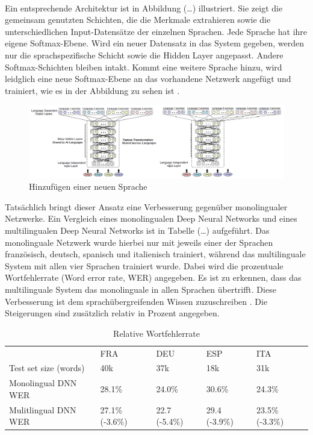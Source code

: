 \\ 
Ein entsprechende Architektur ist in Abbildung (…) illustriert. Sie zeigt die gemeinsam genutzten Schichten, die die Merkmale extrahieren sowie die unterschiedlichen Input-Datensätze der einzelnen Sprachen. Jede Sprache hat ihre eigene Softmax-Ebene. Wird ein neuer Datensatz in das System gegeben, werden nur die sprachspezifische Schicht sowie die Hidden Layer angepasst. Andere Softmax-Schichten bleiben intakt. Kommt eine weitere Sprache hinzu, wird leidglich eine neue Softmax-Ebene an das vorhandene Netzwerk angefügt und trainiert, wie es in der Abbildung zu sehen ist {\cite{Yu.2014}}. 

\begin{figure}[h!]
	\centering
	\includegraphics[width=1.0\linewidth]{images/shared_hidden_layer}
	\caption{Hinzufügen einer neuen Sprache  \cite{GonzalezDominguez.2015}} %
	\label{fig:topology}
\end{figure}

Tatsächlich bringt dieser Ansatz eine Verbesserung gegenüber monolingualer Netzwerke. Ein Vergleich eines monolingualen Deep Neural Networks und eines multilingualen Deep Neural Networks ist in Tabelle (…) aufgeführt. Das monolinguale Netzwerk wurde hierbei nur mit jeweils einer der Sprachen französisch, deutsch, spanisch und italienisch trainiert, während das multilinguale System mit allen vier Sprachen trainiert wurde. Dabei wird die prozentuale Wortfehlerrate (Word error rate, WER) angegeben. Es ist zu erkennen, dass das multilinguale System das monolinguale in allen Sprachen übertrifft. Diese Verbesserung ist dem sprachübergreifenden Wissen zuzuschreiben {\cite{Yu.2014}}. Die Steigerungen sind zusätzlich relativ in Prozent angegeben. 

\begin{table}[h!]
	\begin{tabular}{lllll}
		& FRA             & DEU           & ESP           & ITA             \\
		Test set size (words) & 40k             & 37k           & 18k           & 31k             \\
		Monolingual DNN WER   & 28.1\%          & 24.0\%        & 30.6\%        & 24.3\%          \\
		Mulitlingual DNN WER  & 27.1\% (-3.6\%) & 22.7 (-5.4\%) & 29.4 (-3.9\%) & 23.5\% (-3.3\%)
	\end{tabular}
	\centering
	\caption{Relative Wortfehlerrate {\cite{Yu.2014}}}
	\label{my-label}
\end{table}

